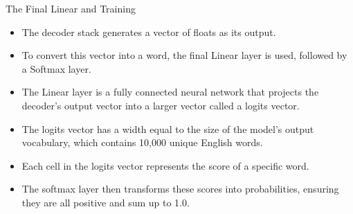 \documentclass[handout]{beamer}
\begin{document}
\begin{frame}{The Final Linear and Training}
\begin{scriptsize}
\begin{itemize}
 \item The decoder stack generates a vector of floats as its output.
 \item To convert this vector into a word, the final Linear layer is used, followed by a Softmax layer. 
 \item The Linear layer is a fully connected neural network that projects the decoder's output vector into a larger vector called a logits vector. 
 \item The logits vector has a width equal to the size of the model's output vocabulary, which contains 10,000 unique English words.
 \item Each cell in the logits vector represents the score of a specific word. 
 \item The softmax layer then transforms these scores into probabilities, ensuring they are all positive and sum up to 1.0. 

\end{itemize}

\end{scriptsize}

\end{frame}
\end{document}
